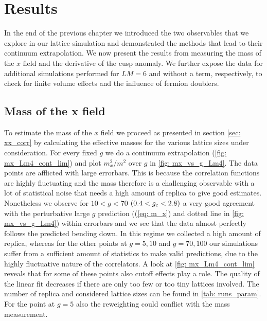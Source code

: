 \chapter{Results}\label{ch: results}
In the end of the previous chapter we introduced the two observables that we explore in our lattice simulation and demonstrated the methods that lead to their continuum extrapolation. We now present the results from measuring the mass of the $x$ field and the derivative of the cusp anomaly. We further expose the data for additional simulations performed for $LM=6$ and without a  term, respectively, to check for finite volume effects and the influence of fermion doublers.
%
%
%
%
%
%
\section[Mass of the x field]{Mass of the x field}
To estimate the mass of the $x$ field we proceed as presented in section \ref{sec: xx_corr} by calculating the effective masses for the various lattice sizes under consideration. For every fixed $g$ we do a continuum extrapolation (\autoref{fig: mx_Lm4_cont_lim}) and plot $m_{x}^{2}/m^{2}$ over $g$ in \autoref{fig: mx_vs_g_Lm4}. The data points are afflicted with large errorbars. This is because the correlation functions are highly fluctuating and the mass therefore is a challenging observable with a lot of statistical noise that needs a high amount of replica to give good estimates. Nonetheless we observe for $10 < g < 70$ $(0.4 < g_{\rm c} < 2.8)$ a very good agreement with the perturbative large $g$ prediction ((\ref{eq: m_x}) and dotted line in \autoref{fig: mx_vs_g_Lm4}) within errorbars and we see that the data almost perfectly follows the predicted bending down. In this regime we collected a high amount of replica, whereas for the other points at $g=5,10$ and $g=70,100$ our simulations suffer from a sufficient amount of statistics to make valid predictions, due to the highly fluctuative nature of the correlators. A look at \autoref{fig: mx_Lm4_cont_lim} reveals that for some of these points also cutoff effects play a role. The quality of the linear fit decreases if there are only too few or too tiny lattices involved. The number of replica and considered lattice sizes can be found in \autoref{tab: runs_param}. For the point at $g=5$ also the reweighting could conflict with the mass measurement.
%
%
%
